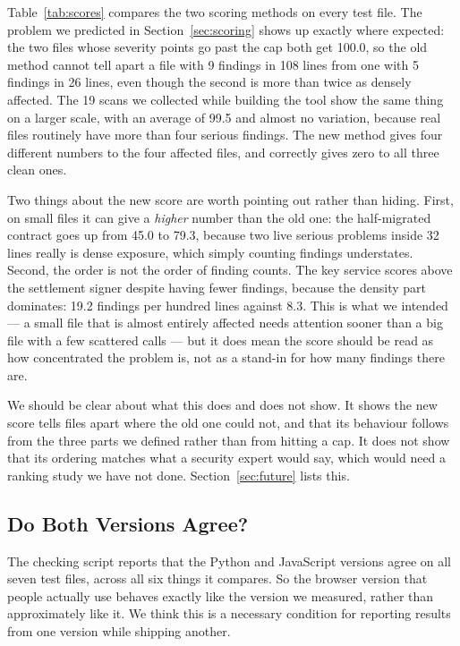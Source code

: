 \documentclass[runningheads]{llncs}
\begin{document}
Table~\ref{tab:scores} compares the two scoring methods on every test file. The
problem we predicted in Section~\ref{sec:scoring} shows up exactly where
expected: the two files whose severity points go past the cap both get 100.0, so
the old method cannot tell apart a file with 9 findings in 108 lines from one
with 5 findings in 26 lines, even though the second is more than twice as
densely affected. The 19 scans we collected while building the tool show the
same thing on a larger scale, with an average of 99.5 and almost no variation,
because real files routinely have more than four serious findings. The new
method gives four different numbers to the four affected files, and correctly
gives zero to all three clean ones.

Two things about the new score are worth pointing out rather than hiding. First,
on small files it can give a \emph{higher} number than the old one: the
half-migrated contract goes up from 45.0 to 79.3, because two live serious
problems inside 32 lines really is dense exposure, which simply counting
findings understates. Second, the order is not the order of finding counts. The
key service scores above the settlement signer despite having fewer findings,
because the density part dominates: 19.2 findings per hundred lines against 8.3.
This is what we intended --- a small file that is almost entirely affected needs
attention sooner than a big file with a few scattered calls --- but it does mean
the score should be read as how concentrated the problem is, not as a stand-in
for how many findings there are.

We should be clear about what this does and does not show. It shows the new
score tells files apart where the old one could not, and that its behaviour
follows from the three parts we defined rather than from hitting a cap. It does
not show that its ordering matches what a security expert would say, which would
need a ranking study we have not done. Section~\ref{sec:future} lists this.

\subsection{Do Both Versions Agree?}

The checking script reports that the Python and JavaScript versions agree on all
seven test files, across all six things it compares. So the browser version that
people actually use behaves exactly like the version we measured, rather than
approximately like it. We think this is a necessary condition for reporting
results from one version while shipping another.
\end{document}
